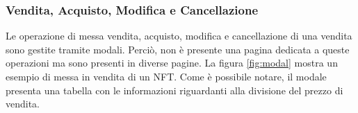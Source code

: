 \subsubsection{Vendita, Acquisto, Modifica e Cancellazione}

Le operazione di messa vendita, acquisto, modifica e cancellazione di una vendita sono gestite tramite modali. Perciò, non è presente una pagina dedicata a queste operazioni ma sono presenti in diverse pagine. La figura \ref{fig:modal} mostra un esempio di messa in vendita di un NFT. Come è possibile notare, il modale presenta una tabella con le informazioni riguardanti alla divisione del prezzo di vendita. 

\begin{figure}[H]
    \begin{minipage}{0.7\textwidth}
      \centering
    \end{minipage}
    \hfill
    \begin{minipage}{0.26\textwidth }
      \centering

\end{minipage}
\end{figure}
